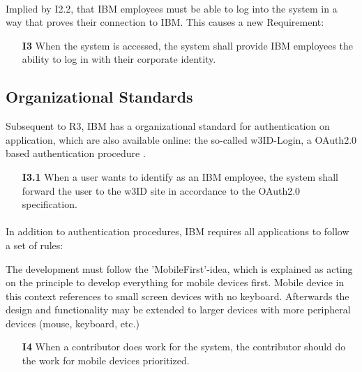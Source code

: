 \paragraph{} Implied by I2.2, that IBM employees must be able to log into the system in a way that proves their connection to IBM. This causes a new Requirement:

\begin{itemize}
    \item [\textbf{I3}] When the system is accessed, the system shall provide IBM employees the ability to log in with their corporate identity.
\end{itemize}


\subsection{Organizational Standards}
Subsequent to R3, IBM has a organizational standard for authentication on application, which are also available online: the so-called w3ID-Login, a OAuth2.0 \parencite[cf.][]{InternetEngineeringTaskForce.2012} based authentication procedure \parencite[cf.][]{IBMCorporation.2016}.

\begin{itemize}
    \item [\textbf{I3.1}] When a user wants to identify as an IBM employee, the system shall forward the user to the w3ID site in accordance to the OAuth2.0 specification.
\end{itemize}

\paragraph{} In addition to authentication procedures, IBM requires all applications to follow a set of rules:

\paragrapph{} The development must follow the 'MobileFirst'-idea, which is explained as acting on the principle to develop everything for mobile devices first. Mobile device in this context references to small screen devices with no keyboard. Afterwards the design and functionality may be extended to larger devices with more peripheral devices (mouse, keyboard, etc.)

\begin{itemize}
    \item [\textbf{I4}] When a contributor does work for the system, the contributor should do the work for mobile devices prioritized.
\end{itemize}

